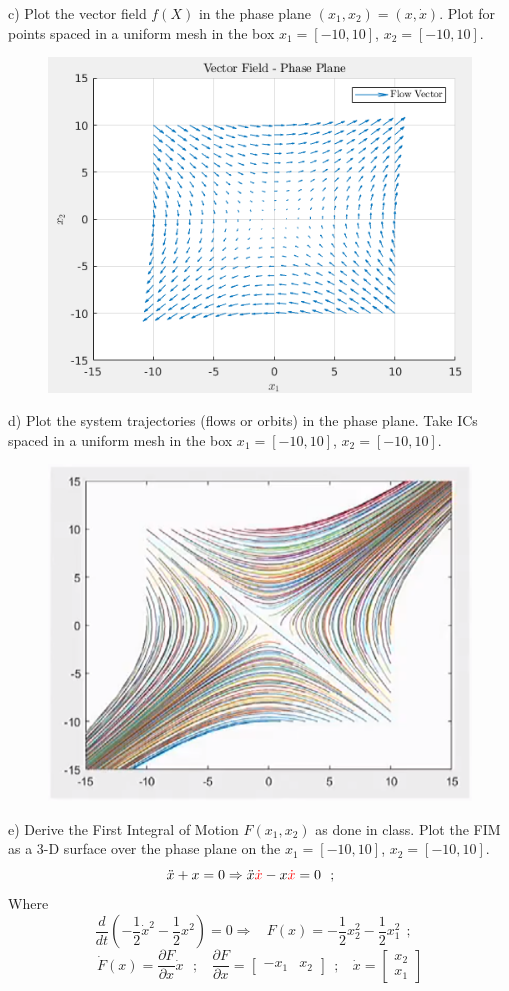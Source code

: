 \documentclass{homeworg}
\begin{document}
c) Plot the vector field \(f(X)\) in the phase plane \((x_1, x_2)=(x, \dot{x})\). Plot for points spaced in a uniform mesh in the box \(x_1=[-10,10]\), \(x_2=[-10,10]\).
\begin{figure}[h]
  \includegraphics[width=.45\textwidth]{fig06.png}
  \centering
\end{figure}

d) Plot the system trajectories (flows or orbits) in the phase plane. Take ICs spaced in a uniform mesh in the box \(x_1=[-10,10]\), \(x_2=[-10,10]\).
\begin{figure}[h]
  \includegraphics[width=.45\textwidth]{fig07.png}
  \centering
\end{figure}
\newpage
e) Derive the First Integral of Motion \(F(x_1,x_2)\) as done in class. Plot the FIM as a 3-D surface over the phase plane on the \(x_1=[-10,10]\), \(x_2=[-10,10]\).
\begin{equation*}
  \ddot{x} + x = 0 \Rightarrow \ddot{x} \textcolor{red}{\dot{x}} -x \textcolor{red}{\dot{x}} = 0 ~~;~~~~
\end{equation*}
Where
\begin{equation*}
  \frac{d}{dt}\left( -\frac{1}{2} \dot{x}^2 -  \frac{1}{2} x^2 \right) = 0 \Rightarrow ~~~~ F(x) =- \frac{1}{2} x_2^2 -  \frac{1}{2} x^2_1 ~~;~~~~
\end{equation*}
\begin{equation*}
\dot{F}(x) = \frac{\partial F}{\partial x} \dot{x}~~~;~~~~ \frac{\partial F}{\partial x} =
\begin{bmatrix}
  -x_1 & x_2
\end{bmatrix}~~;~~~~
\dot{x} =
\begin{bmatrix}
  x_2 \\
  x_1
\end{bmatrix}
\end{equation*}
\end{document}
